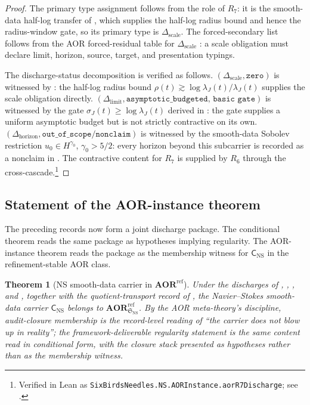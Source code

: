 \documentclass[11pt]{article}
\newcommand{\sigmaJ}{\sigma_J}
\newcommand{\lambdaJ}{\lambda_J}
\newtheorem{theorem}{Theorem}[section]
\theoremstyle{definition}
\begin{document}
\begin{proof}
The primary type assignment follows from the role of
\(R_7\): it is the smooth-data half-log transfer of
, which supplies
the half-log radius bound and hence the radius-window gate,
so its primary type is \(\Delta_{\mathrm{scale}}\).  The
forced-secondary list follows from the AOR forced-residual
table for \(\Delta_{\mathrm{scale}}\) \citep{Tsiokos2026AOR}:
a scale obligation must declare limit, horizon, source,
target, and presentation typings.

The discharge-status decomposition is verified as follows.
\((\Delta_{\mathrm{scale}},\texttt{zero})\) is witnessed by
: the half-log
radius bound \(\rho(t)\gtrsim \log\lambdaJ(t)/\lambdaJ(t)\)
supplies the scale obligation directly.
\((\Delta_{\mathrm{limit}},\texttt{asymptotic\_budgeted,
basic gate})\) is witnessed by the gate
\(\sigmaJ(t)\geq \log\lambdaJ(t)\) derived in
: the gate
supplies a uniform asymptotic budget but is not strictly
contractive on its own.
\((\Delta_{\mathrm{horizon}},\texttt{out\_of\_scope/nonclaim})\)
is witnessed by the smooth-data Sobolev restriction
\(u_0\in H^{\gamma_0}\), \(\gamma_0>5/2\): every horizon
beyond this subcarrier is recorded as a nonclaim in
.  The
contractive content for \(R_7\) is supplied by \(R_6\)
through the cross-cascade.\footnote{Verified in Lean as \texttt{SixBirdsNeedles.NS.AORInstance.aorR7Discharge}; see .}
\end{proof}

\subsection{Statement of the AOR-instance theorem}

The preceding records now form a joint discharge package.  The
conditional theorem 
reads the same package as hypotheses implying regularity.  The
AOR-instance theorem reads the package as the membership witness for
\(\mathsf C_{\mathrm{NS}}\) in the refinement-stable AOR class.

\begin{theorem}[NS smooth-data carrier in $\mathbf{AOR}^{\mathrm{ref}}$]\label{thm:ns:in-refstableaor}
Under the discharges of , , , and , together with the quotient-transport record of , the Navier--Stokes smooth-data carrier $\mathsf C_{\mathrm{NS}}$ belongs to $\mathbf{AOR}^{\mathrm{ref}}_{\mathfrak S_{\mathrm{NS}}}$.  By the AOR meta-theory's discipline, audit-closure membership is the record-level reading of ``the carrier does not blow up in reality''; the framework-deliverable regularity statement  is the same content read in conditional form, with the closure stack presented as hypotheses rather than as the membership witness.
\end{theorem}
\end{document}
